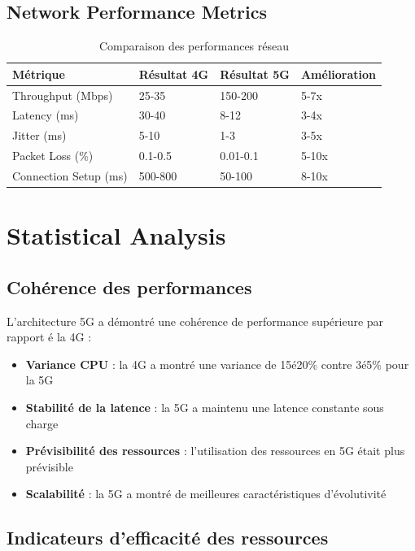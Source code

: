 \documentclass[12pt,a4paper]{report}
\begin{document}
\subsection{Network Performance Metrics}

\begin{table}[H]
\centering
\caption{Comparaison des performances réseau}
\label{tab:network-performance}
\begin{tabular}{@{}llll@{}}
\toprule
Métrique & Résultat 4G & Résultat 5G & Amélioration \\
\midrule
Throughput (Mbps) & 25-35 & 150-200 & 5-7x \\
Latency (ms) & 30-40 & 8-12 & 3-4x \\
Jitter (ms) & 5-10 & 1-3 & 3-5x \\
Packet Loss (\%) & 0.1-0.5 & 0.01-0.1 & 5-10x \\
Connection Setup (ms) & 500-800 & 50-100 & 8-10x \\
\bottomrule
\end{tabular}
\end{table}

\section{Statistical Analysis}

\subsection{Cohérence des performances}

L'architecture 5G a démontré une cohérence de performance supérieure par rapport é la 4G :

\begin{itemize}
    \item \textbf{Variance CPU} : la 4G a montré une variance de 15é20\% contre 3é5\% pour la 5G
    \item \textbf{Stabilité de la latence} : la 5G a maintenu une latence constante sous charge
    \item \textbf{Prévisibilité des ressources} : l'utilisation des ressources en 5G était plus prévisible
    \item \textbf{Scalabilité} : la 5G a montré de meilleures caractéristiques d'évolutivité
\end{itemize}

\subsection{Indicateurs d'efficacité des ressources}
\end{document}
